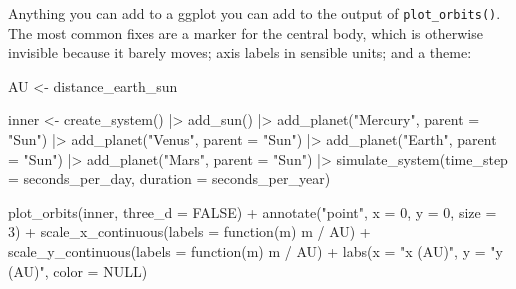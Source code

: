 \documentclass[
  10.5pt,
  letterpaper,
]{scrbook}
\newenvironment{Shaded}{\begin{snugshade}}{\end{snugshade}}
\newcommand{\AttributeTok}[1]{\textcolor[rgb]{0.00,0.00,0.00}{#1}}
\newcommand{\ConstantTok}[1]{\textcolor[rgb]{0.00,0.00,0.00}{#1}}
\newcommand{\ControlFlowTok}[1]{\textcolor[rgb]{0.00,0.00,0.00}{#1}}
\newcommand{\DecValTok}[1]{\textcolor[rgb]{0.00,0.00,0.00}{#1}}
\newcommand{\FunctionTok}[1]{\textcolor[rgb]{0.00,0.00,0.00}{#1}}
\newcommand{\NormalTok}[1]{\textcolor[rgb]{0.00,0.00,0.00}{#1}}
\newcommand{\OtherTok}[1]{\textcolor[rgb]{0.00,0.00,0.00}{#1}}
\newcommand{\SpecialCharTok}[1]{\textcolor[rgb]{0.00,0.00,0.00}{#1}}
\newcommand{\StringTok}[1]{\textcolor[rgb]{0.00,0.00,0.00}{#1}}
\theoremstyle{plain}
\theoremstyle{remark}
\begin{document}
Anything you can add to a ggplot you can add to the output of
\texttt{plot\_orbits()}. The most common fixes are a marker for the
central body, which is otherwise invisible because it barely moves; axis
labels in sensible units; and a theme:

\begin{Shaded}
\begin{Highlighting}[]
\NormalTok{AU }\OtherTok{\textless{}{-}}\NormalTok{ distance\_earth\_sun}

\NormalTok{inner }\OtherTok{\textless{}{-}} \FunctionTok{create\_system}\NormalTok{() }\SpecialCharTok{|\textgreater{}}
  \FunctionTok{add\_sun}\NormalTok{() }\SpecialCharTok{|\textgreater{}}
  \FunctionTok{add\_planet}\NormalTok{(}\StringTok{"Mercury"}\NormalTok{, }\AttributeTok{parent =} \StringTok{"Sun"}\NormalTok{) }\SpecialCharTok{|\textgreater{}}
  \FunctionTok{add\_planet}\NormalTok{(}\StringTok{"Venus"}\NormalTok{,   }\AttributeTok{parent =} \StringTok{"Sun"}\NormalTok{) }\SpecialCharTok{|\textgreater{}}
  \FunctionTok{add\_planet}\NormalTok{(}\StringTok{"Earth"}\NormalTok{,   }\AttributeTok{parent =} \StringTok{"Sun"}\NormalTok{) }\SpecialCharTok{|\textgreater{}}
  \FunctionTok{add\_planet}\NormalTok{(}\StringTok{"Mars"}\NormalTok{,    }\AttributeTok{parent =} \StringTok{"Sun"}\NormalTok{) }\SpecialCharTok{|\textgreater{}}
  \FunctionTok{simulate\_system}\NormalTok{(}\AttributeTok{time\_step =}\NormalTok{ seconds\_per\_day, }\AttributeTok{duration =}\NormalTok{ seconds\_per\_year)}

\FunctionTok{plot\_orbits}\NormalTok{(inner, }\AttributeTok{three\_d =} \ConstantTok{FALSE}\NormalTok{) }\SpecialCharTok{+}
  \FunctionTok{annotate}\NormalTok{(}\StringTok{"point"}\NormalTok{, }\AttributeTok{x =} \DecValTok{0}\NormalTok{, }\AttributeTok{y =} \DecValTok{0}\NormalTok{, }\AttributeTok{size =} \DecValTok{3}\NormalTok{) }\SpecialCharTok{+}
  \FunctionTok{scale\_x\_continuous}\NormalTok{(}\AttributeTok{labels =} \ControlFlowTok{function}\NormalTok{(m) m }\SpecialCharTok{/}\NormalTok{ AU) }\SpecialCharTok{+}
  \FunctionTok{scale\_y\_continuous}\NormalTok{(}\AttributeTok{labels =} \ControlFlowTok{function}\NormalTok{(m) m }\SpecialCharTok{/}\NormalTok{ AU) }\SpecialCharTok{+}
  \FunctionTok{labs}\NormalTok{(}\AttributeTok{x =} \StringTok{"x (AU)"}\NormalTok{, }\AttributeTok{y =} \StringTok{"y (AU)"}\NormalTok{, }\AttributeTok{color =} \ConstantTok{NULL}\NormalTok{)}
\end{Highlighting}
\end{Shaded}
\end{document}
